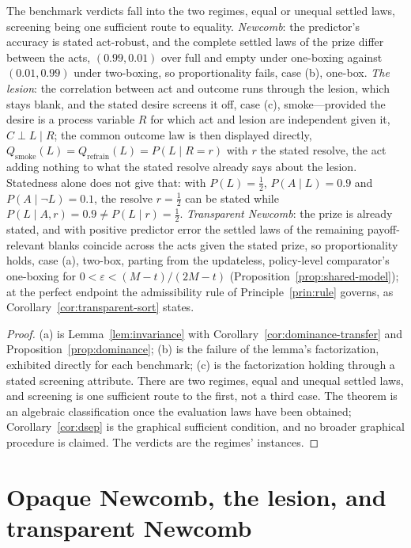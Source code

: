 \begin{theorem}
The benchmark verdicts fall into the two regimes, equal or unequal settled laws, screening being one sufficient route to equality. \emph{Newcomb}: the predictor's accuracy is stated act-robust, and the complete settled laws of the prize differ between the acts, $(0.99, 0.01)$ over full and empty under one-boxing against $(0.01, 0.99)$ under two-boxing, so proportionality fails, case (b), one-box. \emph{The lesion}: the correlation between act and outcome runs through the lesion, which stays blank, and the stated desire screens it off, case (c), smoke---provided the desire is a process variable $R$ for which act and lesion are independent given it, $C \perp L \mid R$; the common outcome law is then displayed directly, $Q_{\mathrm{smoke}}(L) = Q_{\mathrm{refrain}}(L) = P(L \mid R = r)$ with $r$ the stated resolve, the act adding nothing to what the stated resolve already says about the lesion. Statedness alone does not give that: with $P(L) = \tfrac12$, $P(A \mid L) = 0.9$ and $P(A \mid \neg L) = 0.1$, the resolve $r = \tfrac12$ can be stated while $P(L \mid A, r) = 0.9 \neq P(L \mid r) = \tfrac12$. \emph{Transparent Newcomb}: the prize is already stated, and with positive predictor error the settled laws of the remaining payoff-relevant blanks coincide across the acts given the stated prize, so proportionality holds, case (a), two-box, parting from the updateless, policy-level comparator's one-boxing for $0 < \varepsilon < (M - t)/(2M - t)$ (Proposition~\ref{prop:shared-model}); at the perfect endpoint the admissibility rule of Principle~\ref{prin:rule} governs, as Corollary~\ref{cor:transparent-sort} states.
\end{theorem}
\begin{proof}
(a) is Lemma~\ref{lem:invariance} with Corollary~\ref{cor:dominance-transfer} and Proposition~\ref{prop:dominance}; (b) is the failure of the lemma's factorization, exhibited directly for each benchmark; (c) is the factorization holding through a stated screening attribute. There are two regimes, equal and unequal settled laws, and screening is one sufficient route to the first, not a third case. The theorem is an algebraic classification once the evaluation laws have been obtained; Corollary~\ref{cor:dsep} is the graphical sufficient condition, and no broader graphical procedure is claimed. The verdicts are the regimes' instances.
\end{proof}

\section{Opaque Newcomb, the lesion, and transparent Newcomb}
\label{sec:cases}

